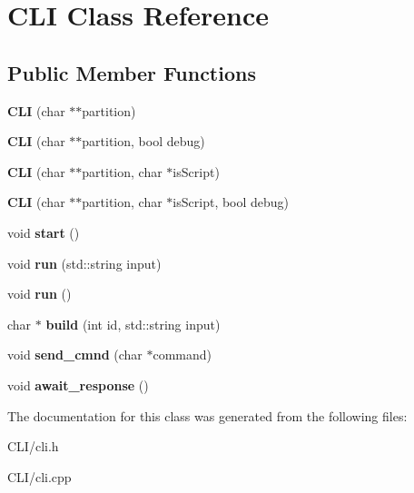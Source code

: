 \hypertarget{classCLI}{}\section{C\+LI Class Reference}
\label{classCLI}
\subsection*{Public Member Functions}
\begin{DoxyCompactItemize}
\item 
\mbox{\label{classCLI_a0c3b5662a3f33b5a76021be177c3eef2}} 
{\bfseries C\+LI} (char $\ast$$\ast$partition)
\item 
\mbox{\label{classCLI_aeafaa56f2b2d8c97121ed52125e3fa9a}} 
{\bfseries C\+LI} (char $\ast$$\ast$partition, bool debug)
\item 
\mbox{\label{classCLI_a4eb5e9a1c695edf4dcc705b9c12a0a8d}} 
{\bfseries C\+LI} (char $\ast$$\ast$partition, char $\ast$is\+Script)
\item 
\mbox{\label{classCLI_a5d9746160fc642addd9b4aff6cc4eef2}} 
{\bfseries C\+LI} (char $\ast$$\ast$partition, char $\ast$is\+Script, bool debug)
\item 
\mbox{\label{classCLI_a1492005f186392031bd4d447cb20e975}} 
void {\bfseries start} ()
\item 
\mbox{\label{classCLI_a5ce3ce0818fc0afe2a277995000ea22b}} 
void {\bfseries run} (std\+::string input)
\item 
\mbox{\label{classCLI_aeefc8cd81999836a90c2cfaced6177f1}} 
void {\bfseries run} ()
\item 
\mbox{\label{classCLI_a2019fb3e1ab4580218d507859883d8dd}} 
char $\ast$ {\bfseries build} (int id, std\+::string input)
\item 
\mbox{\label{classCLI_aba5e2a83a3134c959b1d4fb35c6c72b2}} 
void {\bfseries send\+\_\+cmnd} (char $\ast$command)
\item 
\mbox{\label{classCLI_a87c68e5edcb5750d1199839e6b1f843e}} 
void {\bfseries await\+\_\+response} ()
\end{DoxyCompactItemize}


The documentation for this class was generated from the following files\+:\begin{DoxyCompactItemize}
\item 
C\+L\+I/cli.\+h\item 
C\+L\+I/cli.\+cpp\end{DoxyCompactItemize}
